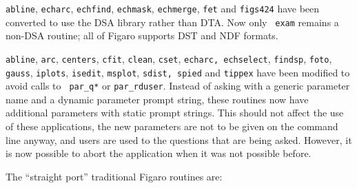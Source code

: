 {\tt ab\-line}, {\tt ech\-arc}, {\tt ech\-find}, {\tt ech\-mask}, {\tt ech\-merge}, {\tt fet} and
{\tt figs424} have
been converted to use the DSA library rather than DTA.  Now only {\tt
exam} remains a non-DSA routine; all of Figaro supports DST and NDF
formats.

{\tt ab\-line}, {\tt arc}, {\tt cen\-ters}, {\tt cfit}, {\tt clean},
{\tt cset}, {\tt ech\-arc, ech\-sel\-ect}, {\tt findsp}, {\tt foto},
{\tt gauss}, {\tt iplots}, {\tt is\-edit}, {\tt ms\-plot}, {\tt sdist,
spied} and {\tt tip\-pex} have been modified to avoid calls to {\tt
par\_q*} or {\tt par\_rd\-user}.  Instead of asking with a generic
parameter name and a dynamic parameter prompt string, these routines
now have additional parameters with static prompt strings.  This should
not affect the use of these applications, the new parameters are not to
be given on the command line anyway, and users are used to the questions
that are being asked.  However, it is now possible to abort the
application when it was not possible before.

The ``straight port'' traditional Figaro routines are:

